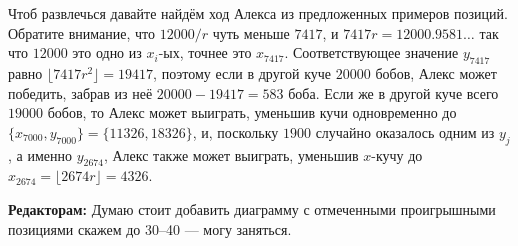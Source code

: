 Чтоб развлечься давайте найдём ход Алекса из предложенных примеров позиций.
Обратите внимание, что $12 000/r$ чуть меньше $7417$, и $7417r = 12 000.9581\dots$ так что $12 000$ это одно из $x_i$-ых, точнее это $x_{7417}$.
Соответствующее значение $y_{7417}$ равно $\lfloor 7417r^2\rfloor = 19 417$, поэтому если в другой куче $20 000$ бобов, Алекс может победить, забрав из неё $20 000 - 19 417 = 583$ боба.
Если же в другой куче всего $19 000$ бобов, то Алекс может выиграть, уменьшив кучи одновременно до $\{x_{7000}, y_{7000}\} = \{11 326, 18 326\}$,
и, поскольку $1900$ случайно оказалось одним из $y_j$, а именно $y_{2674}$, Алекс также может выиграть, уменьшив $x$-кучу до $x_{2674} = \lfloor 2674r\rfloor = 4326$.

\begin{addedbytheeditors}
\textbf{Редакторам:}
Думаю стоит добавить диаграмму с отмеченными проигрышными позициями скажем до 30--40 --- могу заняться.
\end{addedbytheeditors}
